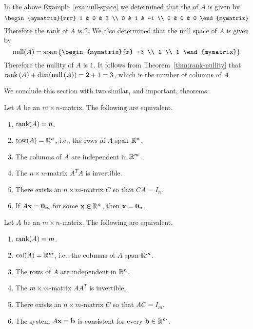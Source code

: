 \begin{solution}
  In the above Example~\ref{exa:null-space} we determined that the
  {\rref} of $A$ is given by
  \begin{equation*}
    \begin{mymatrix}{rrr}
      1 & 0 & 3 \\
      0 & 1 & -1  \\
      0 & 0 & 0
    \end{mymatrix}
  \end{equation*}
  Therefore the rank of $A$ is $2$. We also determined that the null
  space of $A$ is given by
  \begin{equation*}
    \func{null} (A) = \sspan \set{\begin{mymatrix}{r}
        -3 \\
        1 \\
        1
      \end{mymatrix}
    }
  \end{equation*}
  Therefore the nullity of $A$ is $1$. It follows from
  Theorem~\ref{thm:rank-nullity} that
  $\mbox{\rm rank}\left(A\right) + \dim( \mbox{\rm null}\left(A\right)) = 2 + 1 = 3$, which
  is the number of columns of $A$.
\end{solution}

We conclude this section with two similar, and important, theorems.

\begin{theorem}{}{}
  Let $A$ be an $m\times n$-matrix.
  The following are equivalent.
  \begin{enumerate}
  \item $\mbox{\rm rank}(A)=n$.
  \item $\row(A)=\R^n$, i.e., the rows of $A$ span $\mathbb{R}^n$.
  \item The columns of $A$ are independent in $\mathbb{R}^m$.
  \item The $n\times n$-matrix $A^TA$ is invertible.
  \item There exists an $n\times m$-matrix $C$ so that $CA=I_n$.
  \item If $A\mbox{\bf x}=\mbox{\bf 0}_m$ for some $\mbox{\bf x}\in\mathbb{R}^n$,
    then $\mbox{\bf x}=\mbox{\bf 0}_n$.
  \end{enumerate}
\end{theorem}

\begin{theorem}{}{}
  Let $A$ be an $m\times n$-matrix.
  The following are equivalent.
  \begin{enumerate}
  \item $\mbox{\rm rank}(A)=m$.
  \item $\col(A)=\R^m$, i.e., the columns of $A$ span $\mathbb{R}^m$.
  \item The rows of $A$ are independent in $\mathbb{R}^n$.
  \item The $m\times m$-matrix $AA^T$ is invertible.
  \item There exists an $n\times m$-matrix $C$ so that $AC=I_m$.
  \item The system $A\mbox{\bf x}=\mbox{\bf b}$ is consistent for
    every $\mbox{\bf b}\in\mathbb{R}^m$.
  \end{enumerate}
\end{theorem}
